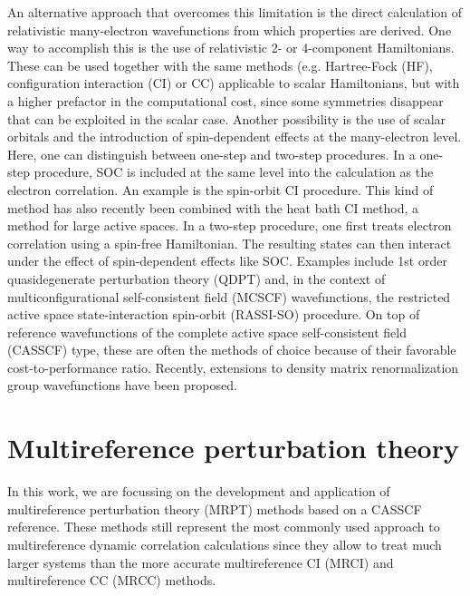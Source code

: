 An alternative approach that overcomes this limitation is the direct calculation of relativistic many-electron wavefunctions from which properties are derived. One way to accomplish this is the use of relativistic 2- or 4-component Hamiltonians.\cite{Saue_2011_3077} These can be used together with the same methods (e.g. Hartree-Fock (HF), configuration interaction (CI) or CC) applicable to scalar Hamiltonians, but with a higher prefactor in the computational cost, since some symmetries disappear that can be exploited in the scalar case. Another possibility is the use of scalar orbitals and the introduction of spin-dependent effects at the many-electron level. Here, one can distinguish between one-step and two-step procedures.\cite{BuenkALLH_1998_3400} In a one-step procedure, SOC is included at the same level into the calculation as the electron correlation. An example is the spin-orbit CI procedure.\cite{BuenkALLH_1998_3400, SjoevoGO_1997_301, YabusZP_1999_5791, KleinTM_2006_124101} This kind of method has also recently been combined with the heat bath CI method, a method for large active spaces.\cite{MussaS_2018_154} In a two-step procedure, one first treats electron correlation using a spin-free Hamiltonian. The resulting states can then interact under the effect of spin-dependent effects like SOC. Examples include 1st order quasidegenerate perturbation theory (QDPT)\cite{BuenkALLH_1998_3400, RakowM_1996_105, GanyuN_2006_24103} and, in the context of multiconfigurational self-consistent field (MCSCF) wavefunctions, the restricted active space state-interaction spin-orbit (RASSI-SO)\cite{MalmqRS_2002_230} procedure. On top of reference wavefunctions of the complete active space self-consistent field (CASSCF) type, these are often the methods of choice because of their favorable cost-to-performance ratio. Recently, extensions to density matrix renormalization group wavefunctions have been proposed.\cite{Roeme_2015_44112, KnechKAR_2016_5881, SayfuC_2016_234301}
\clearpage
\section{Multireference perturbation theory}
In this work, we are focussing on the development and application of multireference perturbation theory (MRPT) methods based on a CASSCF reference. These methods still represent the most commonly used approach to multireference dynamic correlation calculations since they allow to treat much larger systems than the more accurate multireference CI (MRCI)\cite{BuenkP_1974_33, BuenkP_1975_217} and multireference CC (MRCC)\cite{KoehnHMJG_2013_176, BartlM_2007_291}  methods.

